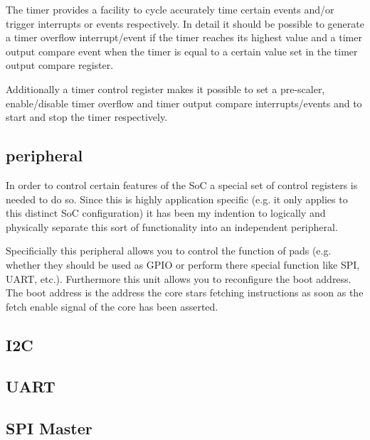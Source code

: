 The timer provides a facility to cycle accurately time certain events and/or trigger interrupts or events respectively. In detail it should be possible to generate a timer overflow interrupt/event if the timer reaches its highest value and a timer output compare event when the timer is equal to a certain value set in the timer output compare register.


Additionally a timer control register makes it possible to set a pre-scaler, enable/disable timer overflow and timer output compare interrupts/events and to start and stop the timer respectively.

\subsection{\pulpino peripheral}
\label{subsec:pulpino_peripheral}

In order to control certain features of the SoC a special set of control registers is needed to do so. Since this is highly application specific (e.g. it only applies to this distinct SoC configuration) it has been my indention to logically and physically separate this sort of functionality into an independent peripheral.

Specificially this peripheral allows you to control the function of pads (e.g. whether they should be used as GPIO or perform there special function like SPI, UART, etc.). Furthermore this unit allows you to reconfigure the boot address. The boot address is the address the core stars fetching instructions as soon as the fetch enable signal of the core has been asserted.

\subsection{I2C}

\subsection{UART}

\subsection{SPI Master}








